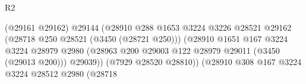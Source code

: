 \begin{lexlean}{R2}
\begin{coremodule}
                                                            (@29161 @29162)
                                                            @29144
                                                            (@28910
                                                              @288
                                                              @1653
                                                              @3224
                                                              @3226
                                                              @28521
                                                              @29162
                                                              (@28718
                                                                @250
                                                                @28521
                                                                (@3450 (@28721 @250)))
                                                              (@28910
                                                                @1651
                                                                @167
                                                                @3224
                                                                @3224
                                                                @28979
                                                                @2980
                                                                (@28963
                                                                  @200
                                                                  @29003
                                                                  @122
                                                                  @28979
                                                                  @29011
                                                                  (@3450 (@29013 @200)))
                                                                @29039))
                                                            (@7929 @28520 @28810))
                                                          (@28910
                                                            @308
                                                            @167
                                                            @3224
                                                            @3224
                                                            @28512
                                                            @2980
                                                            (@28718

\end{coremodule}
\end{lexlean}
